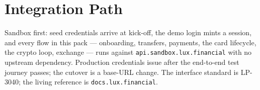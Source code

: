 \documentclass[11pt]{article}
\newcommand{\ep}[1]{\texttt{\small #1}}
\begin{document}
\section{Integration Path}

Sandbox first: seed credentials arrive at kick-off, the demo login
mints a session, and every flow in this pack --- onboarding,
transfers, payments, the card lifecycle, the crypto loop, exchange
--- runs against \ep{api.sandbox.lux.financial} with no upstream
dependency. Production credentials issue after the end-to-end test
journey passes; the cutover is a base-URL change. The interface
standard is LP-3040; the living reference is
\ep{docs.lux.financial}.
\end{document}
